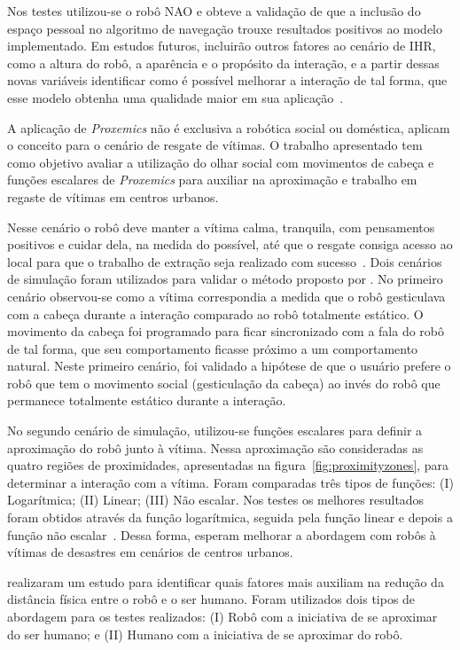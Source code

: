 Nos testes utilizou-se o robô NAO e obteve a validação de que a inclusão do espaço pessoal no algoritmo de navegação trouxe resultados positivos ao modelo implementado. Em estudos futuros,  incluirão outros fatores ao cenário de IHR, como a altura do robô, a aparência e o propósito da interação, e a partir dessas novas variáveis identificar como é possível melhorar a interação de tal forma, que esse modelo obtenha uma qualidade maior em sua aplicação~\cite{Torta:2011}.

A aplicação de \emph{Proxemics} não é exclusiva a robótica social ou doméstica,  aplicam o conceito para o cenário de resgate de vítimas. O trabalho apresentado tem como objetivo avaliar a utilização do olhar social com movimentos de cabeça e funções escalares de \emph{Proxemics} para auxiliar na aproximação e trabalho em regaste de vítimas em centros urbanos.

Nesse cenário o robô deve manter a vítima calma, tranquila, com pensamentos positivos e cuidar dela, na medida do possível, até que o resgate consiga acesso ao local para que o trabalho de extração seja realizado com sucesso~\cite{Srinivasan:2012}. Dois cenários de simulação foram utilizados para validar o método proposto por . No primeiro cenário observou-se como a vítima correspondia a medida que o robô gesticulava com a cabeça durante a interação comparado ao robô totalmente estático. O movimento da cabeça foi programado para ficar sincronizado com a fala do robô de tal forma, que seu comportamento ficasse próximo a um comportamento natural. Neste primeiro cenário, foi validado a hipótese de que o usuário prefere o robô que tem o movimento social (gesticulação da cabeça) ao invés do robô que permanece totalmente estático durante a interação.

No segundo cenário de simulação, utilizou-se funções escalares para definir a aproximação do robô junto à vítima. Nessa aproximação são consideradas as quatro regiões de proximidades, apresentadas na figura~\ref{fig:proximityzones}, para determinar a interação com a vítima. Foram comparadas três tipos de funções: (I) Logarítmica; (II) Linear; (III) Não escalar. Nos testes os melhores resultados foram obtidos através da função logarítmica, seguida pela função linear e depois a função não escalar~\cite{Srinivasan:2012}. Dessa forma,  esperam melhorar a abordagem com robôs à vítimas de desastres em cenários de centros urbanos.

 realizaram um estudo para identificar quais fatores mais auxiliam na redução da distância física entre o robô e o ser humano. Foram utilizados dois tipos de abordagem para os testes realizados: (I) Robô com a iniciativa de se aproximar do ser humano; e (II) Humano com a iniciativa de se aproximar do robô.

